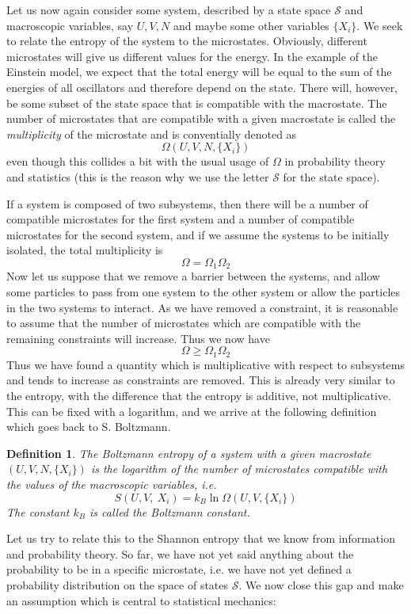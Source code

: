 \documentclass[a4paper, draft]{report}
\numberwithin{section}{chapter}
\numberwithin{equation}{chapter}
\theoremstyle{own}
\newtheorem{defn}{Definition}[section]
\theoremstyle{remark}
\begin{document}
Let us now again consider some system, described by a state space ${\mathcal S}$ and macroscopic variables, say $U, V, N$ and maybe some other variables $\{X_i \}$. We seek to relate the entropy of the system to the microstates. Obviously, different microstates will give us different values for the energy. In the example of the Einstein model, we expect that the total energy will be equal to the sum of the energies of all oscillators and therefore depend on the state. There will, however, be some subset of the state space that is compatible with the macrostate. The number of microstates that are compatible with a given macrostate is called the {\em multiplicity} of the microstate and is conventially denoted as
$$
\Omega(U,V,N, \{ X_i\})
$$
even though this collides a bit with the usual usage of $\Omega$ in probability theory and statistics (this is the reason why we use the letter ${\mathcal S}$ for the state space).

If a system is composed of two subsystems, then there will be a number of compatible microstates for the first system and a number of compatible microstates for the second system, and if we assume the systems to be initially isolated, the total multiplicity is
$$
\Omega = \Omega_1 \Omega_2
$$
Now let us suppose that we remove a barrier between the systems, and allow some particles to pass from one system to the other system or allow the particles in the two systems to interact. As we have removed a constraint, it is reasonable to assume that the number of microstates which are compatible with the remaining constraints will increase. Thus we now have
$$
\Omega \geq \Omega_1 \Omega_2
$$
Thus we have found a quantity which is multiplicative with respect to subsystems and tends to increase as constraints are removed. This is already very similar to the entropy, with the difference that the entropy is additive, not multiplicative. This can be fixed with a logarithm, and we arrive at the following definition which goes back to S. Boltzmann.

\begin{defn}
The {\em Boltzmann entropy} of a system with a given macrostate $(U,V,N, \{X_i\})$ is the logarithm of the number of microstates compatible with the values of the macroscopic variables, i.e.
$$
S(U,V,{\ X_i}) = k_B \ln \Omega(U,V,\{ X_i\})
$$
The constant $k_B$ is called the {\em Boltzmann constant}.
\end{defn}

Let us try to relate this to the Shannon entropy that we know from information and probability theory. So far, we have not yet said anything about the probability to be in a specific microstate, i.e. we have not yet defined a probability distribution on the space of states ${\mathcal S}$. We now close this gap and make an assumption which is central to statistical mechanics: 
\end{document}
